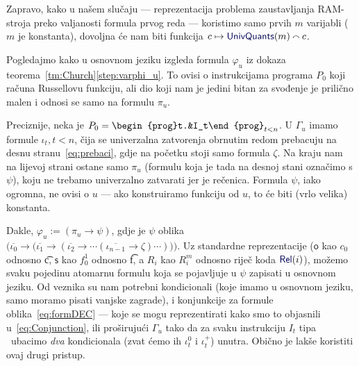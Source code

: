 Zapravo, kako u našem slučaju --- reprezentacija problema zaustavljanja RAM-stroja preko valjanosti formula prvog reda --- koristimo samo prvih $m$ varijabli ($m$ je konstanta), dovoljna će nam biti funkcija $c\mapsto\f{UnivQuants}(m)\conc{}c$.

Pogledajmo kako u osnovnom jeziku izgleda formula $\varphi_u$ iz dokaza teorema~\ref{tm:Church}\eqref{step:varphi_u}. To ovisi o instrukcijama programa $P_0$ koji računa Russellovu funkciju, ali dio koji nam je jedini bitan za svođenje je prilično malen i odnosi se samo na formulu $\pi_u$.

Preciznije, neka je $P_0=\begin{prog}t.&I_t\end{prog}_{t<n}$. U $\Gamma_u$ imamo formule $\iota_t,t<n$, čija se univerzalna zatvorenja obrnutim redom prebacuju na desnu stranu~\eqref{eq:prebaci}, gdje na početku stoji samo formula $\zeta$. Na kraju nam na lijevoj strani ostane samo $\pi_u$ (formulu koja je tada na desnoj stani označimo s $\psi$), koju ne trebamo univerzalno zatvarati jer je rečenica. Formula $\psi$, iako ogromna, ne ovisi o $u$ --- ako konstruiramo funkciju od $u$, to će biti (vrlo velika) konstanta.

    Dakle, $\varphi_u:=(\pi_u\to\psi)$, gdje je $\psi$ oblika $\bigl(\overline{\iota_0}\to\bigl(\overline{\iota_1}\to(\overline{\iota_2}\to\dotsb(\overline{\iota_{n-1}}\to\zeta)\dotsm)\bigr)\bigr)$\text.
Uz standardne reprezentacije ($\mathsf o$ kao $c_0$ odnosno \t c, $\mathsf s$ kao $f_0^1$ odnosno \t f, a $R_i$ kao $R_i^m$ odnosno riječ koda $\f{Rel}(i)$), možemo svaku pojedinu atomarnu formulu koja se pojavljuje u $\psi$ zapisati u osnovnom jeziku. Od veznika su nam potrebni kondicionali (koje imamo u osnovnom jeziku, samo moramo pisati vanjske zagrade), i konjunkcije za formule oblika~\eqref{eq:formDEC} --- koje se mogu reprezentirati kako smo to objasnili u~\eqref{eq:Conjunction}, ili proširujući $\Gamma_u$ tako da za svaku instrukciju $I_t$ tipa \dec\ ubacimo \emph{dva} kondicionala (zvat ćemo ih $\iota_t^0$ i $\iota_t^+$) unutra. Obično je lakše koristiti ovaj drugi pristup.

